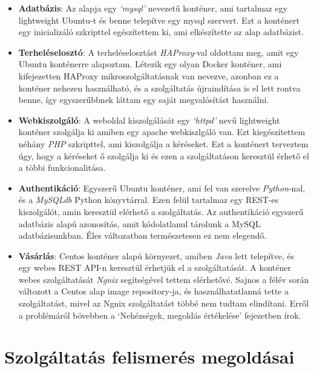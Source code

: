 \documentclass[11pt,magyar,a4paper,twoside,]{report}
\providecommand{\tightlist}{%
  \setlength{\itemsep}{0pt}\setlength{\parskip}{0pt}}
\begin{document}
\begin{itemize}
\tightlist
\item
  \textbf{Adatbázis}: Az alapja egy \emph{`mysql'} nevezetű konténer,
  ami tartalmaz egy lightweight Ubuntu-t és benne telepítve egy mysql
  szervert. Ezt a konténert egy inicializáló szkripttel egészítettem ki,
  ami elkészítette az alap adatbázist.
\item
  \textbf{Terheléselosztó}: A terheléselosztást \emph{HAProxy}-val
  oldottam meg, amit egy Ubuntu konténerre alapoztam. Létezik egy olyan
  Docker konténer, ami kifejezetten HAProxy mikroszolgáltatásnak van
  nevezve, azonban ez a konténer nehezen használható, és a szolgáltatás
  újraindítása is el lett rontva benne, így egyszerűbbnek láttam egy
  saját megvalósítást használni.
\item
  \textbf{Webkiszolgáló}: A weboldal kiszolgálását egy \emph{`httpd'}
  nevű lightweight konténer szolgálja ki amiben egy apache webkiszlgáló
  van. Ezt kiegészítettem néhány \emph{PHP} szkripttel, ami kiszolgálja
  a kéréseket. Ezt a konténert terveztem úgy, hogy a kéréseket ő
  szolgálja ki és ezen a szolgáltatáson keresztül érhető el a többi
  funkcionalitása.
\item
  \textbf{Authentikáció}: Egyszerű Ubuntu konténer, ami fel van szerelve
  \emph{Python}-nal, és a \emph{MySQLdb} Python könyvtárral. Ezen felül
  tartalmaz egy REST-es kiszolgálót, amin keresztül elérhető a
  szolgáltatás. Az authentikáció egyszerű adatbázis alapú azonosítás,
  amit kódolatlanul tárolunk a MySQL adatbázisunkban. Éles változatban
  természetesen ez nem elegendő.
\item
  \textbf{Vásárlás}: Centos konténer alapú környezet, amiben \emph{Java}
  lett telepítve, és egy webes REST API-n keresztül érhetjük el a
  szolgáltatását. A konténer webes szolgáltatását \emph{Ngnix}
  segítségével tettem elérhetővé. Sajnos a félév során változott a
  Centos alap image repository-ja, és használhatatlanná tette a
  szolgáltatást, mivel az Ngnix szolgáltatást többé nem tudtam
  elindítani. Erről a problémáról bövebben a `Nehézségek, megoldás
  értékelése' fejezetben írok.
\end{itemize}

\section{Szolgáltatás felismerés
megoldásai}\label{szolguxe1ltatuxe1s-felismeruxe9s-megolduxe1sai}
\end{document}
